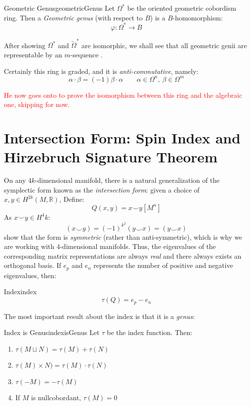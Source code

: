 \documentclass{book}
\newcommand{\R}{{\mathbb{R}}}
\let\temp\phi
\let\phi\varphi
\let\varphi\temp
\newcommand{\dcup}{\sqcup}
\begin{document}
\begin{defn}{Geometric Genus}{geometricGenus}
  Let $\Omega^*$ be the oriented geometric cobordism ring. Then a \emph{Geometric genus} (with respect to $B$)
  is a $B$-homomorphism:
  \[
    \phi: \Omega^* \to B
  \]
\end{defn}

After showing $\Omega^*$ and $\widetilde{\Omega}^*$ are isomorphic, we shall see that all geometric genii are
representable by an $m$-sequence .


Certainly this ring is graded, and it is \emph{anti-commutative}, namely:
\[
  \alpha\cdot \beta = (-1)\beta\cdot\alpha \qquad \alpha \in \Omega^n,\ \beta \in \Omega^m
\]

\textcolor{red}{He now goes onto to prove the isomorphism between this ring and the algebraic one, skipping
for now.}


\section{Intersection Form: Spin Index and Hirzebruch Signature Theorem}

On any $4k$-dimensional manifold, there is a natural generalization of the symplectic form known as the
\emph{intersection form}: given a choice of $x,y \in H^{2k}(M, \R)$, Define:
\[
  Q(x,y) = x\smile y[M^n]
\]
As $x\smile y \in H^4k$:
\[
  (x\smile y) = (-1)^{k^2}(y\smile x) = (y\smile x)
\]
show that the form is \emph{symmetric} (rather than anti-symmetric), which is why we are working with
$4$-dimensional manifolds. Thus, the eigenvalues of the corresponding matrix representations are always
\emph{real} and there always exists an orthogonal basis. If $e_p$ and $e_n$ represents the number of positive
and negative eigenvalues, then:
\begin{defn}{Index}{index}
  \[
  \tau(Q) = e_p - e_n
\]
\end{defn}

The most important result about the index is that it is a \emph{genus}:

\begin{thm}{Index is Genus}{indexisGenus}
  Let $\tau$ be the index function. Then:
  \begin{enumerate}
    \item $\tau(M\dcup N) = \tau(M) + \tau(N)$
    \item $\tau(M)\times N) =\tau(M)\cdot \tau(N)$
    \item $\tau(-M) = -\tau(M)$
    \item If $M$ is nullcobordant, $\tau(M) = 0$
  \end{enumerate}
\end{thm}
\end{document}
